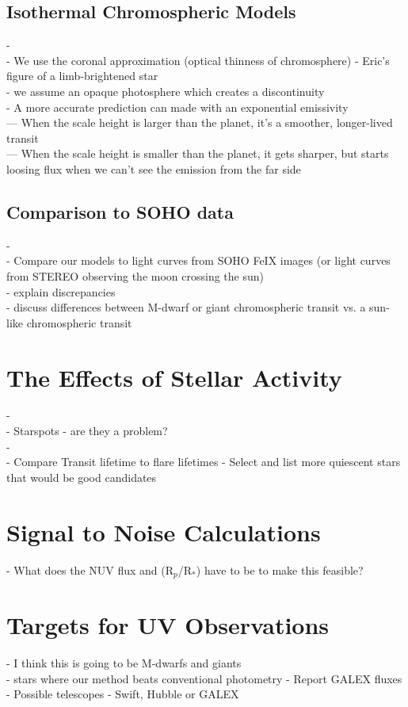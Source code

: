 \documentclass[manuscript]{aastex}
\begin{document}
\subsection{Isothermal Chromospheric Models}
- \\
- We use the coronal approximation (optical thinness of chromosphere)
- Eric's figure of a limb-brightened star \\
 - we assume an opaque photosphere which creates a discontinuity \\
- A more accurate prediction can made with an exponential emissivity \\
--- When the scale height is larger than the planet, it's a smoother, longer-lived transit \\
--- When the scale height is smaller than the planet, it gets sharper, but starts loosing flux when we can't see the emission from the far side \\


\subsection{Comparison to SOHO data}
-\\
- Compare our models to light curves from SOHO FeIX images
 (or light curves from STEREO observing the moon crossing the sun) \\
- explain discrepancies\\
- discuss differences between M-dwarf or giant chromospheric transit
vs. a sun-like chromospheric transit \\

\section{The Effects of Stellar Activity}\label{labl:stactv}
-\\
-    Starspots - are they a problem? \\
-\\
-    Compare Transit lifetime to flare lifetimes
-  Select and list more quiescent stars that would be good candidates

\section{Signal to Noise Calculations} \label{labl:sn}
- What does the NUV flux and (R$_p$/R$_*$) have to be to make this feasible?

\section{Targets for UV Observations} \label{labl:targ}
- I think this is going to be M-dwarfs and giants \\
- stars where our method beats conventional photometry
-      Report GALEX fluxes \\
-   Possible telescopes - Swift, Hubble or GALEX \\
\end{document}
